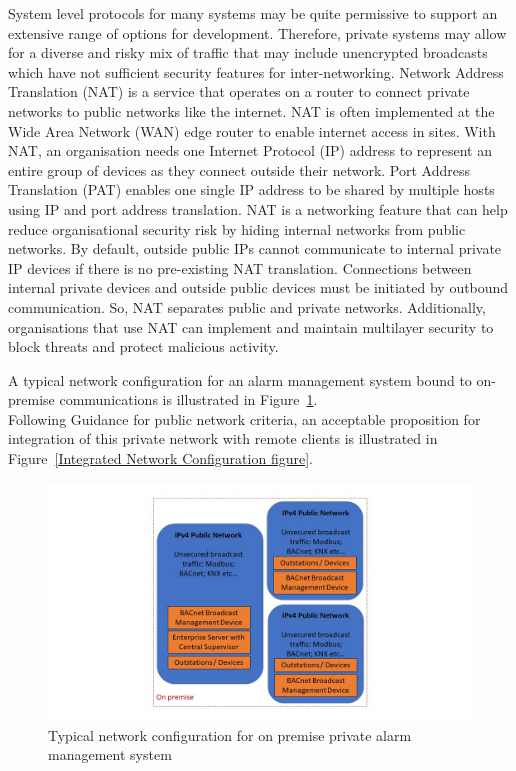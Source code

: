 \documentclass[11pt, oneside]{article}   	%
\begin{document}
System level protocols for many systems may be quite permissive to support an extensive range of options for development.
Therefore, private systems may allow for a diverse and risky mix of traffic that may include unencrypted broadcasts which have not sufficient security features for inter-networking.
Network Address Translation (NAT) is a service that operates on a router to connect private networks to public networks like the internet.
NAT is often implemented at the Wide Area Network (WAN) edge router to enable internet access in sites.
With NAT, an organisation needs one Internet Protocol (IP) address to represent an entire group of devices as they connect outside their network.
Port Address Translation (PAT) enables one single IP address to be shared by multiple hosts using IP and port address translation.
NAT is a networking feature that can help reduce organisational security risk by hiding internal networks from public networks.
By default, outside public IPs cannot communicate to internal private IP devices if there is no pre-existing NAT translation.
Connections between internal private devices and outside public devices must be initiated by outbound communication.
So, NAT separates public and private networks.
Additionally, organisations that use NAT can implement and maintain multilayer security to block threats and protect malicious activity.

A typical network configuration for an alarm management system bound to on-premise communications is illustrated in Figure~\ref{Typical Network Configuration figure}.\\
Following Guidance for public network criteria, an acceptable proposition for integration of this private network with remote clients is illustrated in Figure~\ref{Integrated Network Configuration figure}.

\pagebreak

\FloatBarrier
\begin{figure}
\begin{center}
\includegraphics[width=1\textwidth]{typicalPrivateNetwork.jpg}
\caption{Typical network configuration for on premise private alarm management system}
\label{Typical Network Configuration figure}
\end{center}
\end{figure}
\FloatBarrier
\end{document}
